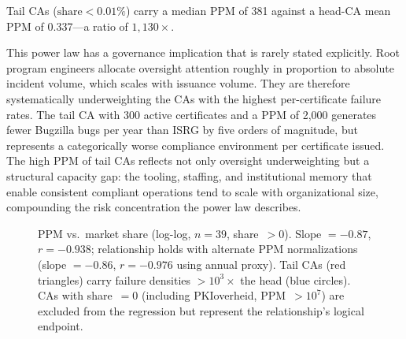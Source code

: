 \documentclass[10pt,twocolumn,letterpaper]{article}
\begin{document}
Tail CAs ($\text{share} < 0.01\%$) carry a median PPM of 381 against a
head-CA mean PPM of 0.337---a ratio of $1{,}130\times$.

This power law has a governance implication that is rarely stated
explicitly. Root program engineers allocate oversight attention roughly
in proportion to absolute incident volume, which scales with issuance volume.
They are therefore systematically underweighting the CAs with the highest
per-certificate failure rates. The tail CA with 300 active certificates and
a PPM of 2,000 generates fewer Bugzilla bugs per year than ISRG by five
orders of magnitude, but represents a categorically worse compliance
environment per certificate issued. The high PPM of tail CAs reflects not
only oversight underweighting but a structural capacity gap: the tooling,
staffing, and institutional memory that enable consistent compliant
operations tend to scale with organizational size, compounding the risk
concentration the power law describes.

\begin{figure}[t]
\centering
{}
\caption{PPM vs.\ market share (log-log, $n=39$, share~$>0$). Slope $=-0.87$,
$r=-0.938$; relationship holds with alternate PPM normalizations
(slope $=-0.86$, $r=-0.976$ using annual proxy).
Tail CAs (red triangles) carry failure densities $>10^3\times$ the
head (blue circles). CAs with share~$=0$ (including PKIoverheid,
PPM~$>10^7$) are excluded from the regression but represent the
relationship's logical endpoint.}
\label{fig:ppmscatter}
\end{figure}
\end{document}

